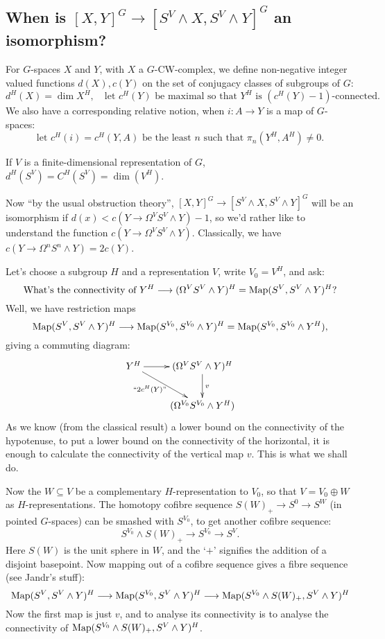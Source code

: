 \documentclass[11pt]{article}
\begin{document}
\begin{FirstNineLectures}
\subsection*{When is $[X,Y]^G\to[S^V\wedge X,S^V\wedge Y]^G$ an isomorphism?}
For $G$-spaces $X$ and $Y$, with $X$ a $G$-CW-complex, we define non-negative integer valued functions $d(X),c(Y)$ on the set of conjugacy classes of subgroups of $G$:
\[d^H(X)=\dim X^H,\quad \text{let $c^H(Y)$ be maximal so that $Y^H$ is $(c^H(Y)-1)$-connected.}\]
We also have a corresponding relative notion, when $i:A\to Y$ is a map of $G$-spaces:
\[\text{let $c^H(i)=c^H(Y,A)$ be the least $n$ such that $\pi_n(Y^H,A^H)\neq0$.}\]
\begin{exmp*}
If $V$ is a finite-dimensional representation of $G$, $d^H(S^V)=C^H(S^V)=\dim (V^H)$.
\end{exmp*}
Now ``by the usual obstruction theory'', $[X,Y]^G\to[S^V\wedge X,S^V\wedge Y]^G$ will be an isomorphism if $d(x)<c(Y\to\Omega^VS^V\wedge Y)-1$, so we'd rather like to understand the function $c(Y\to\Omega^VS^V\wedge Y)$. Classically, we have $c(Y\to\Omega^nS^n\wedge Y)=2c(Y)$.

Let's choose a subgroup $H$ and a representation $V$, write $V_0=V^H$, and ask:
\[\text{What's the connectivity of }
Y^H\longrightarrow(\Omega^VS^V\wedge Y)^H=\operatorname{Map}(S^V,S^V\wedge Y)^H?\]
Well, we have restriction maps
\[\operatorname{Map}(S^V,S^V\wedge Y)^H\longrightarrow\operatorname{Map}(S^{V_0},S^{V_0}\wedge Y)^H=\operatorname{Map}(S^{V_0},S^{V_0}\wedge Y^H),\]
giving a commuting diagram:
\[\xymatrix{
Y^H\ar[r]\ar[dr]_(.4){\text{``$2c^H(Y)$''}}&(\Omega^VS^V\wedge Y)^H\ar[d]^v\\
&(\Omega^{V_0}S^{V_0}\wedge Y^H)
}\]
As we know (from the classical result) a lower bound on the connectivity of the hypotenuse, to put a lower bound on the connectivity of the horizontal, it is enough to calculate the connectivity of the vertical map $v$. This is what we shall do.

Now the $W\subseteq V$ be a complementary $H$-representation to $V_0$, so that $V=V_0\oplus W$ as $H$-representations. The homotopy cofibre sequence $S(W)_+\to S^0\to S^W$ (in pointed $G$-spaces) can be smashed with $S^{V_0}$, to get another cofibre sequence:
\[S^{V_0}\wedge S(W)_+\to S^{V_0}\to S^V.\]
Here $S(W)$ is the unit sphere in $W$, and the `$+$' signifies the addition of a disjoint basepoint. Now mapping out of a cofibre sequence gives a fibre sequence (see Jandr's stuff):
\[\operatorname{Map}(S^V,S^V\wedge Y)^H\longrightarrow\operatorname{Map}(S^{V_0},S^V\wedge Y)^H\longrightarrow \operatorname{Map}(S^{V_0}\wedge S(W)_+,S^V\wedge Y)^H\]
Now the first map is just $v$, and to analyse its connectivity is to analyse the connectivity of $\operatorname{Map}(S^{V_0}\wedge S(W)_+,S^V\wedge Y)^H$.


\end{FirstNineLectures}
\end{document}
